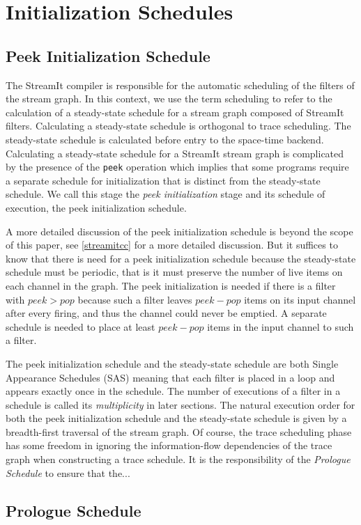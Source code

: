 \section{Initialization Schedules}
\subsection{Peek Initialization Schedule}
The StreamIt compiler is responsible for the automatic scheduling of
the filters of the stream graph. In this context, we use the term
scheduling to refer to the calculation of a steady-state schedule for
a stream graph composed of StreamIt filters.  Calculating a
steady-state schedule is orthogonal to trace scheduling. The
steady-state schedule is calculated before entry to the space-time
backend.  Calculating a steady-state schedule for a StreamIt stream
graph is complicated by the presence of the {\tt peek} operation which
implies that some programs require a separate schedule for
initialization that is distinct from the steady-state schedule.  We
call this stage the {\it peek initialization} stage and its schedule
of execution, the {peek initialization schedule}.

A more detailed discussion of the peek initialization schedule is
beyond the scope of this paper, see \ref{streamitcc} for a more
detailed discussion.  But it suffices to know that there is
need for a peek initialization schedule because the steady-state schedule
must be periodic, that is it must preserve the number of live items on
each channel in the graph.  The peek initialization is needed if there
is a filter with $peek > pop$ because such a filter leaves $peek -
pop$ items on its input channel after every firing, and thus the
channel could never be emptied.  A separate schedule is needed to
place at least $peek - pop$ items in the input channel to such a filter.

The peek initialization schedule and the steady-state schedule are
both Single Appearance Schedules (SAS) meaning that each filter is
placed in a loop and appears exactly once in the schedule.  The number
of executions of a filter in a schedule is called its {\it
multiplicity} in later sections.  The natural execution order for both
the peek initialization schedule and the steady-state schedule is
given by a breadth-first traversal of the stream graph. Of course, the
trace scheduling phase has some freedom in ignoring the
information-flow dependencies of the trace graph when constructing a
trace schedule.  It is the responsibility of the {\it Prologue
Schedule} to ensure that the...

\subsection{Prologue Schedule}
